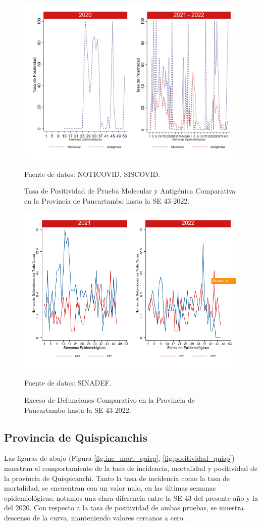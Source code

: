 \documentclass[12pt,a4paper,openany]{book}
\begin{document}
	\begin{figure}[h]
		\caption{Tasa de Positividad de Prueba Molecular y Antigénica Comparativa en la Provincia de Paucartambo hasta la SE 43-2022.}\label{fig:positividad_paucartam}
		\begin{center}
			\includegraphics[width=0.7\linewidth]{../figuras/positividad_20_21_11.png}
		\end{center}
		{\footnotesize {Fuente de datos: NOTICOVID, SISCOVID.}}
	\end{figure}
	
	\begin{figure}[h]
		\caption{Exceso de Defunciones Comparativo en la Provincia de Paucartambo hasta la SE 43-2022.}\label{fig:exceso_paucartam}
		\begin{center}
			\includegraphics[width=0.7\linewidth]{../figuras/exceso_11.pdf}
		\end{center}
		{\footnotesize {Fuente de datos: SINADEF.}}
	\end{figure}
	
	\clearpage
	
	\subsection*{Provincia de Quispicanchis}
	\noindent Las figuras de abajo (Figura \ref{fig:inc_mort_quisp}, \ref{fig:positividad_quisp}) muestran el comportamiento de la tasa de incidencia, mortalidad y positividad de la provincia de Quispicanchi. Tanto la tasa de incidencia como la tasa de mortalidad, se encuentran con un valor nulo, en las últimas semanas epidemiológicas; notamos una clara diferencia entre la SE 43 del presente año y la del 2020. Con respecto a la tasa de positividad de ambas pruebas, se muestra descenso de la curva, manteniendo valores cercanos a cero.
	
\end{document}
